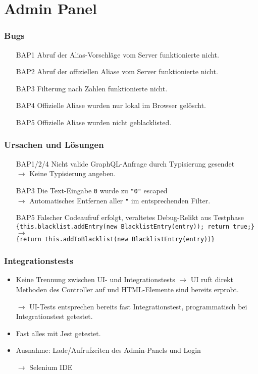\section{Admin Panel}

\begin{frame}\frametitle{Bugs}
    \begin{itemize}
        \item[BAP1] Abruf der Alias-Vorschläge vom Server funktionierte nicht.
        \item[BAP2] Abruf der offiziellen Aliase vom Server funktionierte nicht.
        \item[BAP3] Filterung nach Zahlen funktionierte nicht.
        \item[BAP4] Offizielle Aliase wurden nur lokal im Browser gelöscht.
        \item[BAP5] Offizielle Aliase wurden nicht geblacklisted.
    \end{itemize}
\end{frame} 

\begin{frame}\frametitle{Ursachen und Lösungen}
    \begin{adjustwidth}{1.5em}{0pt}
        \begin{itemize}
            \item[BAP1/2/4] Nicht valide GraphQL-Anfrage durch Typisierung gesendet \\
                $\rightarrow$ Keine Typisierung angeben.
            \item[BAP3] Die Text-Eingabe \texttt{0} wurde zu \texttt{"0"} escaped \\
                $\rightarrow$ Automatisches Entfernen aller \texttt{"} im entsprechenden Filter.
            \item[BAP5] Falscher Codeaufruf erfolgt, veraltetes Debug-Relikt aus Testphase \\ 
                \texttt{\{this.blacklist.addEntry(new BlacklistEntry(entry)); return true;\}} $\rightarrow$ \\
                \texttt{\{return this.addToBlacklist(new BlacklistEntry(entry))\}}
        \end{itemize}
    \end{adjustwidth}
\end{frame}

\begin{frame}\frametitle{Integrationstests}
    \begin{itemize}
        \item Keine Trennung zwischen UI- und Integrationstests $\rightarrow$ UI ruft direkt Methoden des Controller auf 
            und HTML-Elemente sind bereits erprobt. 
        \item[$\rightarrow$] UI-Tests entsprechen bereits fast Integrationstest, programmatisch bei Integrationstest getestet.
        \item Fast alles mit Jest getestet.
        \item Ausnahme: Lade/Aufrufzeiten des Admin-Panels und Login
        \item[$\rightarrow$] Selenium IDE 
    \end{itemize}
\end{frame}

